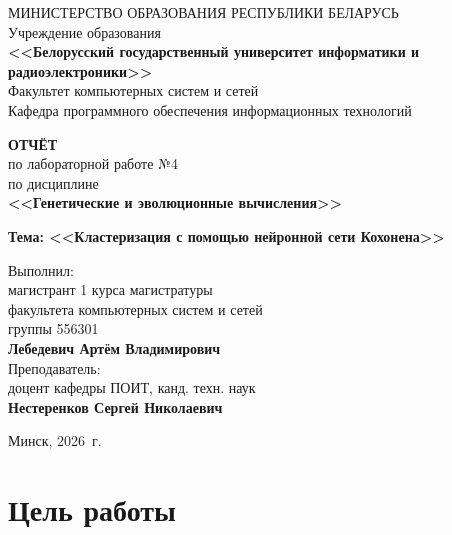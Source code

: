 \documentclass[14pt,a4paper]{extarticle}
\begin{document}
\thispagestyle{empty}

\begin{center}
МИНИСТЕРСТВО ОБРАЗОВАНИЯ РЕСПУБЛИКИ БЕЛАРУСЬ\\[0.5em]
Учреждение образования\\[0.5em]
\textbf{<<Белорусский государственный университет информатики и радиоэлектроники>>}\\[2em]

Факультет компьютерных систем и сетей\\[0.5em]
Кафедра программного обеспечения информационных технологий
\end{center}

\vspace{3em}

\begin{center}
\textbf{ОТЧЁТ}\\[0.5em]
по лабораторной работе №4\\[0.5em]
по дисциплине\\[0.5em]
\textbf{<<Генетические и эволюционные вычисления>>}

\textbf{Тема: <<Кластеризация с помощью нейронной сети Кохонена>>}
\end{center}

\vspace{4em}

\hfill\begin{minipage}{0.55\textwidth}
Выполнил:\\
магистрант 1 курса магистратуры\\
факультета компьютерных систем и сетей\\
группы 556301\\[0.3em]
\textbf{Лебедевич Артём Владимирович}\\[1.2em]
Преподаватель:\\
доцент кафедры ПОИТ, канд. техн. наук\\
\textbf{Нестеренков Сергей Николаевич}
\end{minipage}

\vfill

\begin{center}
Минск, 2026~г.
\end{center}

\newpage

\tableofcontents

\newpage

\section{Цель работы}
\end{document}
